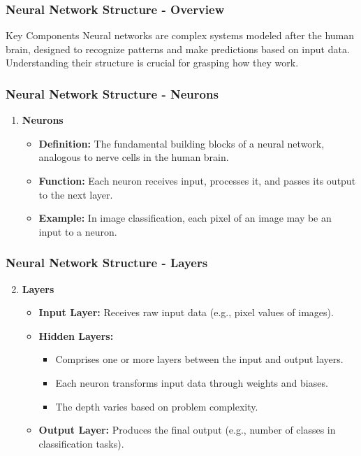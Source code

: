 \documentclass[aspectratio=169]{beamer}
\begin{document}
\begin{frame}[fragile]
    \frametitle{Neural Network Structure - Overview}
    \begin{block}{Key Components}
        Neural networks are complex systems modeled after the human brain, designed to recognize patterns and make predictions based on input data. Understanding their structure is crucial for grasping how they work.
    \end{block}
\end{frame}

\begin{frame}[fragile]
    \frametitle{Neural Network Structure - Neurons}
    \begin{enumerate}
        \item \textbf{Neurons}
        \begin{itemize}
            \item \textbf{Definition:} The fundamental building blocks of a neural network, analogous to nerve cells in the human brain.
            \item \textbf{Function:} Each neuron receives input, processes it, and passes its output to the next layer.
            \item \textbf{Example:} In image classification, each pixel of an image may be an input to a neuron.
        \end{itemize}
    \end{enumerate}
\end{frame}

\begin{frame}[fragile]
    \frametitle{Neural Network Structure - Layers}
    \begin{enumerate}
        \setcounter{enumi}{1}
        \item \textbf{Layers}
        \begin{itemize}
            \item \textbf{Input Layer:} Receives raw input data (e.g., pixel values of images).
            \item \textbf{Hidden Layers:} 
            \begin{itemize}
                \item Comprises one or more layers between the input and output layers.
                \item Each neuron transforms input data through weights and biases.
                \item The depth varies based on problem complexity.
            \end{itemize}
            \item \textbf{Output Layer:} Produces the final output (e.g., number of classes in classification tasks).
        \end{itemize}
    \end{enumerate}
\end{frame}
\end{document}
